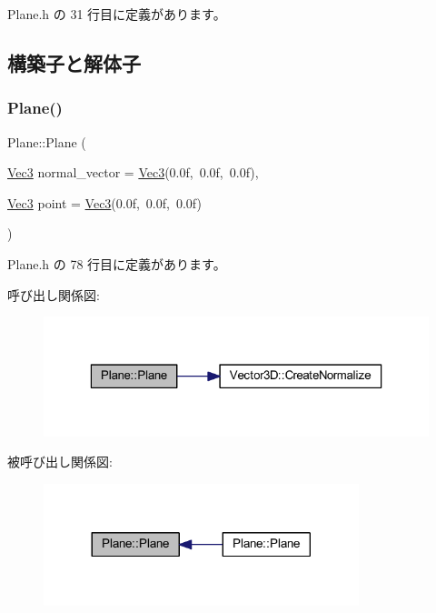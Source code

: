  Plane.\+h の 31 行目に定義があります。



\subsection{構築子と解体子}
\mbox{\label{class_plane_a026c307dff6ed919b337f1ed7e579798}} 
\subsubsection{\texorpdfstring{Plane()}{Plane()}\hspace{0.1cm}{\footnotesize\ttfamily [1/2]}}
{\footnotesize\ttfamily Plane\+::\+Plane (\begin{DoxyParamCaption}\item[{\mbox{\hyperlink{_vector3_d_8h_ab16f59e4393f29a01ec8b9bbbabbe65d}{Vec3}}}]{normal\+\_\+vector = {\ttfamily \mbox{\hyperlink{_vector3_d_8h_ab16f59e4393f29a01ec8b9bbbabbe65d}{Vec3}}(0.0f,~0.0f,~0.0f)},  }\item[{\mbox{\hyperlink{_vector3_d_8h_ab16f59e4393f29a01ec8b9bbbabbe65d}{Vec3}}}]{point = {\ttfamily \mbox{\hyperlink{_vector3_d_8h_ab16f59e4393f29a01ec8b9bbbabbe65d}{Vec3}}(0.0f,~0.0f,~0.0f)} }\end{DoxyParamCaption})\hspace{0.3cm}{\ttfamily [inline]}}



 Plane.\+h の 78 行目に定義があります。

呼び出し関係図\+:\nopagebreak
\begin{figure}[H]
\begin{center}
\leavevmode
\includegraphics[width=323pt]{class_plane_a026c307dff6ed919b337f1ed7e579798_cgraph}
\end{center}
\end{figure}
被呼び出し関係図\+:\nopagebreak
\begin{figure}[H]
\begin{center}
\leavevmode
\includegraphics[width=260pt]{class_plane_a026c307dff6ed919b337f1ed7e579798_icgraph}
\end{center}
\end{figure}
\mbox{\label{class_plane_a9554deff9f83d09a772c15bca3d468d5}} 
